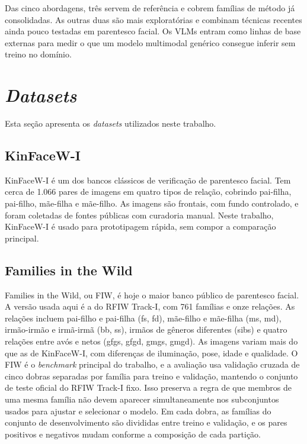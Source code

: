 Das cinco abordagens, três servem de referência e cobrem famílias de método já consolidadas. As outras duas são mais exploratórias e combinam técnicas recentes ainda pouco testadas em parentesco facial. Os VLMs entram como linhas de base externas para medir o que um modelo multimodal genérico consegue inferir sem treino no domínio.

\section{\textit{Datasets}}

Esta seção apresenta os \textit{datasets} utilizados neste trabalho.

\subsection{KinFaceW-I}

KinFaceW-I é um dos bancos clássicos de verificação de parentesco facial. Tem cerca de 1.066 pares de imagens em quatro tipos de relação, cobrindo pai-filha, pai-filho, mãe-filha e mãe-filho. As imagens são frontais, com fundo controlado, e foram coletadas de fontes públicas com curadoria manual. Neste trabalho, KinFaceW-I é usado para prototipagem rápida, sem compor a comparação principal.

\subsection{Families in the Wild}

Families in the Wild, ou FIW, é hoje o maior banco público de parentesco facial. A versão usada aqui é a do RFIW Track-I, com 761 famílias e onze relações. As relações incluem pai-filho e pai-filha (fs, fd), mãe-filho e mãe-filha (ms, md), irmão-irmão e irmã-irmã (bb, ss), irmãos de gêneros diferentes (sibs) e quatro relações entre avós e netos (gfgs, gfgd, gmgs, gmgd). As imagens variam mais do que as de KinFaceW-I, com diferenças de iluminação, pose, idade e qualidade. O FIW é o \textit{benchmark} principal do trabalho, e a avaliação usa validação cruzada de cinco dobras separadas por família para treino e validação, mantendo o conjunto de teste oficial do RFIW Track-I fixo. Isso preserva a regra de que membros de uma mesma família não devem aparecer simultaneamente nos subconjuntos usados para ajustar e selecionar o modelo. Em cada dobra, as famílias do conjunto de desenvolvimento são divididas entre treino e validação, e os pares positivos e negativos mudam conforme a composição de cada partição.

